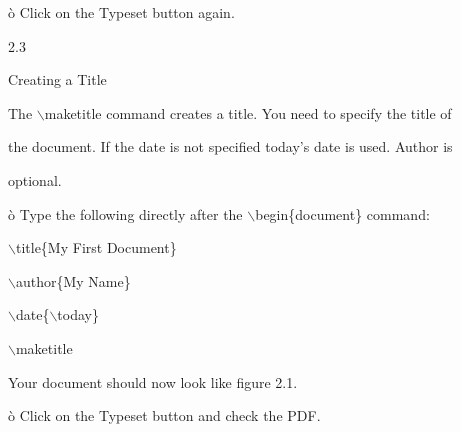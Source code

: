 \documentclass[a4paper,portrait,12pt]{article}
\begin{document}
\begin{flushleft}
\`{o} Click on the Typeset button again.
\end{flushleft}





2.3





\begin{flushleft}
Creating a Title
\end{flushleft}





\begin{flushleft}
The \ensuremath{\backslash}maketitle command creates a title. You need to specify the title of
\end{flushleft}


\begin{flushleft}
the document. If the date is not specified today's date is used. Author is
\end{flushleft}


\begin{flushleft}
optional.
\end{flushleft}


\begin{flushleft}
\`{o} Type the following directly after the \ensuremath{\backslash}begin\{document\} command:
\end{flushleft}


\begin{flushleft}
\ensuremath{\backslash}title\{My First Document\}
\end{flushleft}


\begin{flushleft}
\ensuremath{\backslash}author\{My Name\}
\end{flushleft}


\begin{flushleft}
\ensuremath{\backslash}date\{\ensuremath{\backslash}today\}
\end{flushleft}


\begin{flushleft}
\ensuremath{\backslash}maketitle
\end{flushleft}


\begin{flushleft}
Your document should now look like figure 2.1.
\end{flushleft}


\begin{flushleft}
\`{o} Click on the Typeset button and check the PDF.
\end{flushleft}
\end{document}
